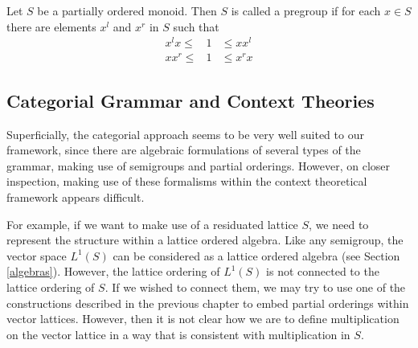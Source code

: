 \documentclass[12pt]{report}
\begin{document}
\begin{defn}[Pregroup]
Let $S$ be a partially ordered monoid. Then $S$ is called a pregroup if for each $x\in S$ there are elements $x^l$ and $x^r$ in $S$ such that
\begin{eqnarray*}
x^lx \le &1& \le xx^l\\
xx^r \le &1& \le x^rx
\end{eqnarray*}
\end{defn}





\subsection{Categorial Grammar and Context Theories}

Superficially, the categorial approach seems to be very well suited to our framework, since there are algebraic formulations of several types of the grammar, making use of semigroups and partial orderings. However, on closer inspection, making use of these formalisms within the context theoretical framework appears difficult.

For example, if we want to make use of a residuated lattice $S$, we need to represent the structure within a lattice ordered algebra. Like any semigroup, the vector space $L^1(S)$ can be considered as a lattice ordered algebra (see Section \ref{algebras}). However, the lattice ordering of $L^1(S)$ is not connected to the lattice ordering of $S$. If we wished to connect them, we may try to use one of the constructions described in the previous chapter to embed partial orderings within vector lattices. However, then it is not clear how we are to define multiplication on the vector lattice in a way that is consistent with multiplication in $S$.
\end{document}
